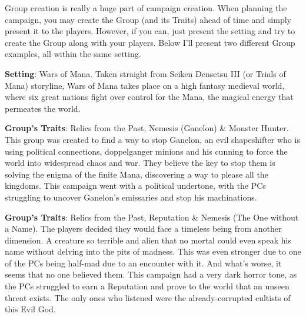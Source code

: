 \begin{multimog}
Group creation is really a huge part of campaign creation. When planning the campaign, you may create the Group (and its Traits) ahead of time and simply present it to the players. However, if you can, just present the setting and try to create the Group along with your players. Below I'll present two different Group examples, all within the same setting. \pc%

\textbf{Setting}: Wars of Mana. Taken straight from Seiken Densetsu III (or Trials of Mana) storyline, Wars of Mana takes place on a high fantasy medieval world, where six great nations fight over control for the Mana, the magical energy that permeates the world. \pc%

\textbf{ Group's Traits}: Relics from the Past, Nemesis (Ganelon) \& Monster Hunter. This group was created to find a way to stop Ganelon, an evil shapeshifter who is using political connections, doppelganger minions and his cunning to force the world into widespread chaos and war. They believe the key to stop them is solving the enigma of the finite Mana, discovering a way to please all the kingdoms. This campaign went with a political undertone, with the PCs struggling to uncover Ganelon's emissaries and stop his machinations. \pc%

\textbf{ Group's Traits}: Relics from the Past, Reputation \& Nemesis (The One without a Name). The players decided they would face a timeless being from another dimension. A creature so terrible and alien that no mortal could even speak his name without delving into the pits of madness. This was even stronger due to one of the PCs being half-mad due to an encounter with it. And what’s worse, it seems that no one believed them. This campaign had a very dark horror tone, as the PCs struggled to earn a Reputation and prove to the world that an unseen threat exists. The only ones who listened were the already-corrupted cultists of this Evil God.
\end{multimog}
\clearpage
